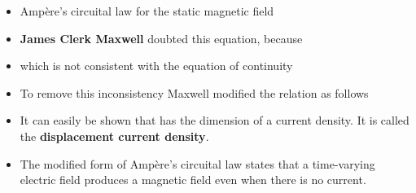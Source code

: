 \begin{ELunit}

\begin{itemize}
\tightlist
\item
  Ampère's circuital law for the static magnetic field
\end{itemize}


\begin{itemize}
\tightlist
\item
  \textbf{James Clerk Maxwell} doubted this equation, because
\end{itemize}


\begin{itemize}
\tightlist
\item
  which is not consistent with the equation of continuity
\end{itemize}


\begin{itemize}
\tightlist
\item
  To remove this inconsistency Maxwell modified the relation as follows
\end{itemize}


\end{ELunit}

\begin{ELimportant}{}


\end{ELimportant}

\begin{ELunit}

\begin{itemize}
\tightlist
\item
  It can easily be shown that  has the dimension of a current density. It is called the \textbf{displacement current density}.
\item
  The modified form of Ampère's circuital law states that a time-varying electric field produces a magnetic field even when there is no current.
\end{itemize}

\end{ELunit}

